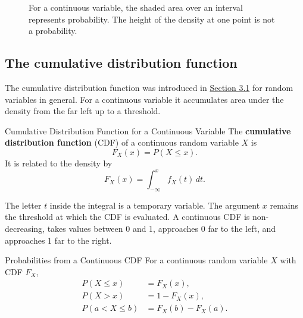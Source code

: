 \begin{figure}[htbp]
\centering
{}
\caption{For a continuous variable, the shaded area over an interval represents probability. The height of the density at one point is not a probability.}
\label{fig:continuous-density-area}
\end{figure}

\subsection{The cumulative distribution function}

The cumulative distribution function was introduced in \hyperref[sec:random-variables-pmf-cdf]{Section 3.1} for random variables in general. For a continuous variable it accumulates area under the density from the far left up to a threshold.

\begin{definition}{Cumulative Distribution Function for a Continuous Variable}
The \textbf{cumulative distribution function} (CDF) of a continuous random variable $X$ is
\[
    F_X(x)=P(X\leq x).
\]
It is related to the density by
\[
    F_X(x)=\int_{-\infty}^{x} f_X(t)\,dt.
\]
\end{definition}

The letter $t$ inside the integral is a temporary variable. The argument $x$ remains the threshold at which the CDF is evaluated. A continuous CDF is non-decreasing, takes values between 0 and 1, approaches 0 far to the left, and approaches 1 far to the right.

\begin{theorem}{Probabilities from a Continuous CDF}
For a continuous random variable $X$ with CDF $F_X$,
\[
\begin{aligned}
P(X\leq x)&=F_X(x),\\
P(X>x)&=1-F_X(x),\\
P(a<X\leq b)&=F_X(b)-F_X(a).
\end{aligned}
\]
\end{theorem}

